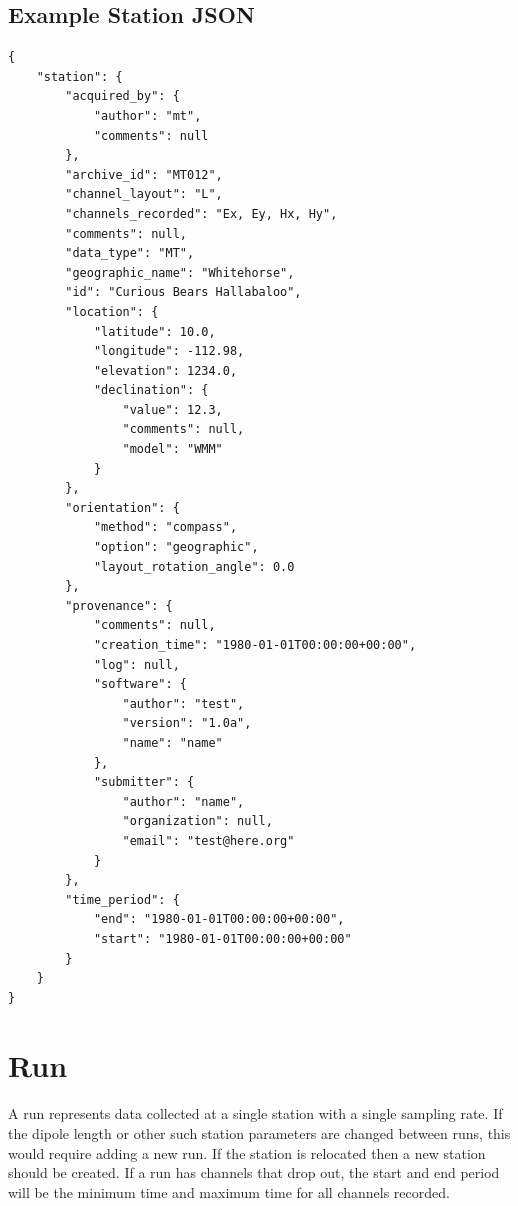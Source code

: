 \documentclass[12pt]{article}
\begin{document}
\clearpage   
\newpage
\subsection{Example Station JSON}

\begin{verbatim}
{
    "station": {
        "acquired_by": {
            "author": "mt",
            "comments": null
        },
        "archive_id": "MT012",
        "channel_layout": "L",
        "channels_recorded": "Ex, Ey, Hx, Hy",
        "comments": null,
        "data_type": "MT",
        "geographic_name": "Whitehorse",
        "id": "Curious Bears Hallabaloo",
        "location": {
            "latitude": 10.0,
            "longitude": -112.98,
            "elevation": 1234.0,
            "declination": {
                "value": 12.3,
                "comments": null,
                "model": "WMM"
            }
        },
        "orientation": {
            "method": "compass",
            "option": "geographic",
            "layout_rotation_angle": 0.0
        },
        "provenance": {
            "comments": null,
            "creation_time": "1980-01-01T00:00:00+00:00",
            "log": null,
            "software": {
                "author": "test",
                "version": "1.0a",
                "name": "name"
            },
            "submitter": {
                "author": "name",
                "organization": null,
                "email": "test@here.org"
            }
        },
        "time_period": {
            "end": "1980-01-01T00:00:00+00:00",
            "start": "1980-01-01T00:00:00+00:00"
        }
    }
}
\end{verbatim}

\newpage
\section{Run}

A run represents data collected at a single station with a single sampling rate. If the dipole length or other such station parameters are changed between runs, this would require adding a new run.  If the station is relocated then a new station should be created.  If a run has channels that drop out, the start and end period will be the minimum time and maximum time for all channels recorded. 
\end{document}
